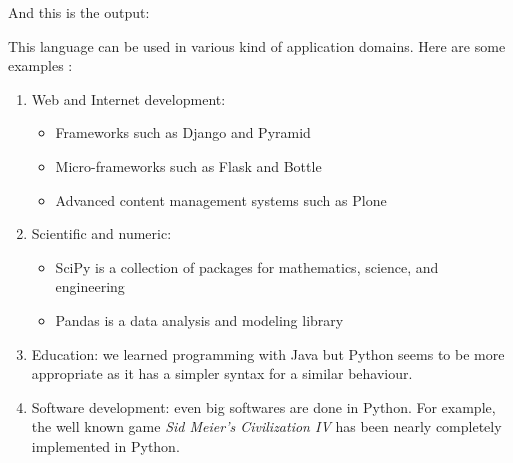 And this is the output:


This language can be used in various kind of application domains. Here are some examples \cite{python_applications}:
\begin{enumerate}
    \item{Web and Internet development:
        \begin{itemize}
            \item Frameworks such as Django and Pyramid
            \item Micro-frameworks such as Flask and Bottle
            \item Advanced content management systems such as Plone
        \end{itemize}
    }
    \item{Scientific and numeric:
        \begin{itemize}
            \item SciPy is a collection of packages for mathematics, science, and engineering
            \item Pandas is a data analysis and modeling library
        \end{itemize}
    
    }
    \item Education: we learned programming with Java but Python seems to be more appropriate as it has a simpler syntax for a similar behaviour.
    \item Software development: even big softwares are done in Python. For example, the well known game \emph{Sid Meier's Civilization IV} has been nearly completely implemented in Python.
\end{enumerate}
